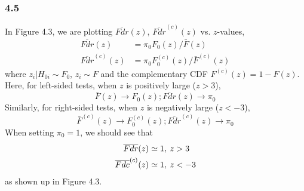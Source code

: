 \documentclass{article}\usepackage{graphicx, color}
\begin{document}
\subsubsection*{4.5}
In Figure 4.3, we are plotting $\overline{Fdr}(z)$, $\overline{Fdr}^{(c)}(z)$ vs. $z$-values,
\begin{displaymath}
\begin{split}
\overline{Fdr}(z) &= \pi_0F_0(z) / \bar{F}(z) \\
\overline{Fdr}^{(c)}(z) &= \pi_0F_0^{(c)}(z) / \bar{F}^{(c)}(z)
\end{split}
\end{displaymath}
where $z_i | H_{0i} \sim F_0$, $z_i \sim F$ and the complementary CDF
$F^{(c)}(z)= 1 - F(z)$. \newline
Here, for left-sided tests, when $z$ is positively large ($z>3$),
\begin{displaymath}
\bar{F}(z) \rightarrow F_0(z);
\overline{Fdr}(z) \rightarrow \pi_0
\end{displaymath}
Similarly, for right-sided tests, when $z$ is negatively large ($z<-3$),
\begin{displaymath}
\bar{F}^{(c)}(z) \rightarrow F_0^{(c)}(z);
\overline{Fdr}^{(c)}(z) \rightarrow \pi_0
\end{displaymath}
When setting $\pi_0 = 1$, we should see that
\begin{displaymath}
\begin{split}
\overline{Fdr}(z) \simeq 1, &\hspace{4 pt} z>3 \\
\overline{Fdc}^{(c)}(z) \simeq 1, &\hspace{4 pt} z<-3 
\end{split}
\end{displaymath}
as shown up in Figure 4.3.
\end{document}
